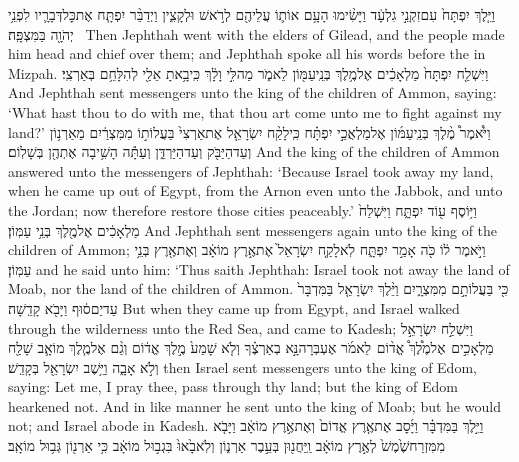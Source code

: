 {וַיֵּ֤לֶךְ יִפְתָּח֙ עִם\maqqaf זִקְנֵ֣י גִלְעָ֔ד וַיָּשִׂ֨ימוּ הָעָ֥ם אוֹת֛וֹ עֲלֵיהֶ֖ם לְרֹ֣אשׁ וּלְקָצִ֑ין וַיְדַבֵּ֨ר יִפְתָּ֧ח אֶת\maqqaf כׇּל\maqqaf דְּבָרָ֛יו לִפְנֵ֥י יְהֹוָ֖ה בַּמִּצְפָּֽה׃ \petucha }
{Then Jephthah went with the elders of Gilead, and the people made him head and chief over them; and Jephthah spoke all his words before the \lord\space in Mizpah.}
{וַיִּשְׁלַ֤ח יִפְתָּח֙ מַלְאָכִ֔ים אֶל\maqqaf מֶ֥לֶךְ בְּנֵֽי\maqqaf עַמּ֖וֹן לֵאמֹ֑ר מַה\maqqaf לִּ֣י וָלָ֔ךְ כִּֽי\maqqaf בָ֥אתָ אֵלַ֖י לְהִלָּחֵ֥ם בְּאַרְצִֽי׃}
{And Jephthah sent messengers unto the king of the children of Ammon, saying: ‘What hast thou to do with me, that thou art come unto me to fight against my land?’}
{וַיֹּ֩אמֶר֩ מֶ֨לֶךְ בְּנֵֽי\maqqaf עַמּ֜וֹן אֶל\maqqaf מַלְאֲכֵ֣י יִפְתָּ֗ח כִּֽי\maqqaf לָקַ֨ח יִשְׂרָאֵ֤ל אֶת\maqqaf אַרְצִי֙ בַּעֲלוֹת֣וֹ מִמִּצְרַ֔יִם מֵאַרְנ֥וֹן וְעַד\maqqaf הַיַּבֹּ֖ק וְעַד\maqqaf הַיַּרְדֵּ֑ן וְעַתָּ֕ה הָשִׁ֥יבָה אֶתְהֶ֖ן בְּשָׁלֽוֹם׃}
{And the king of the children of Ammon answered unto the messengers of Jephthah: ‘Because Israel took away my land, when he came up out of Egypt, from the Arnon even unto the Jabbok, and unto the Jordan; now therefore restore those cities peaceably.’}
{וַיּ֥וֹסֶף ע֖וֹד יִפְתָּ֑ח וַיִּשְׁלַח֙ מַלְאָכִ֔ים אֶל\maqqaf מֶ֖לֶךְ בְּנֵ֥י עַמּֽוֹן׃}
{And Jephthah sent messengers again unto the king of the children of Ammon;}
{וַיֹּ֣אמֶר ל֔וֹ כֹּ֖ה אָמַ֣ר יִפְתָּ֑ח לֹֽא\maqqaf לָקַ֤ח יִשְׂרָאֵל֙ אֶת\maqqaf אֶ֣רֶץ מוֹאָ֔ב וְאֶת\maqqaf אֶ֖רֶץ בְּנֵ֥י עַמּֽוֹן׃}
{and he said unto him: ‘Thus saith Jephthah: Israel took not away the land of Moab, nor the land of the children of Ammon.}
{כִּ֖י בַּעֲלוֹתָ֣ם מִמִּצְרָ֑יִם וַיֵּ֨לֶךְ יִשְׂרָאֵ֤ל בַּמִּדְבָּר֙ עַד\maqqaf יַם\maqqaf ס֔וּף וַיָּבֹ֖א קָדֵֽשָׁה׃}
{But when they came up from Egypt, and Israel walked through the wilderness unto the Red Sea, and came to Kadesh;}
{וַיִּשְׁלַ֣ח יִשְׂרָאֵ֣ל מַלְאָכִ֣ים \pasek  אֶל\maqqaf מֶ֩לֶךְ֩ אֱד֨וֹם \pasek  לֵאמֹ֜ר אֶעְבְּרָה\maqqaf נָּ֣א בְאַרְצֶ֗ךָ וְלֹ֤א שָׁמַע֙ מֶ֣לֶךְ אֱד֔וֹם וְגַ֨ם אֶל\maqqaf מֶ֧לֶךְ מוֹאָ֛ב שָׁלַ֖ח וְלֹ֣א אָבָ֑ה וַיֵּ֥שֶׁב יִשְׂרָאֵ֖ל בְּקָדֵֽשׁ׃}
{then Israel sent messengers unto the king of Edom, saying: Let me, I pray thee, pass through thy land; but the king of Edom hearkened not. And in like manner he sent unto the king of Moab; but he would not; and Israel abode in Kadesh.}
{וַיֵּ֣לֶךְ בַּמִּדְבָּ֗ר וַיָּ֜סׇב אֶת\maqqaf אֶ֤רֶץ אֱדוֹם֙ וְאֶת\maqqaf אֶ֣רֶץ מוֹאָ֔ב וַיָּבֹ֤א מִמִּזְרַח\maqqaf שֶׁ֙מֶשׁ֙ לְאֶ֣רֶץ מוֹאָ֔ב וַֽיַּחֲנ֖וּן בְּעֵ֣בֶר אַרְנ֑וֹן וְלֹֽא\maqqaf בָ֙אוּ֙ בִּגְב֣וּל מוֹאָ֔ב כִּ֥י אַרְנ֖וֹן גְּב֥וּל מוֹאָֽב׃}
